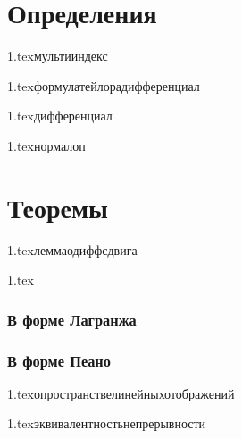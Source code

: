 

\usepackage{sectsty}

\allsectionsfont{\raggedright}
\subsectionfont{\fontsize{14}{15}\selectfont}

\cfoot{}
\rfoot{}




\section{Определения}

{1.tex}{мультииндекс}

{1.tex}{формулатейлорадифференциал}

{1.tex}{дифференциал}

{1.tex}{нормалоп}

\section{Теоремы}

{1.tex}{леммаодиффсдвига}

{1.tex}{}
\subsubsection{В форме Лагранжа}
\subsubsection{В форме Пеано}

{1.tex}{опространствелинейныхотображений}

{1.tex}{эквивалентностьнепрерывности}

